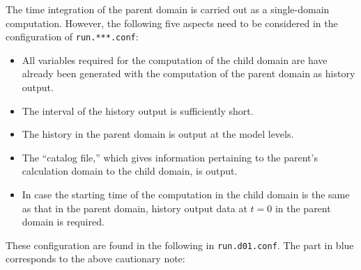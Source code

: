 The time integration of the parent domain is carried out as a single-domain computation. However, the following five aspects need to be considered in the configuration of \verb|run.***.conf|:
\begin{itemize}
 \item All variables required for the computation of the child domain are have already been generated with the computation of the parent domain as history output.
 \item The interval of the history output is sufficiently short.
 \item The history in the parent domain is output at the model levels.
 \item The ``catalog file,'' which gives information pertaining to the parent’s calculation domain
   to the child domain, is output.
 \item In case the starting time of the computation in the child domain is the same as that in the parent domain,
 history output data at $t=0$ in the parent domain is required.
\end{itemize}
These configuration are found in the following in \verb|run.d01.conf|. The part in blue corresponds to the above cautionary note:


